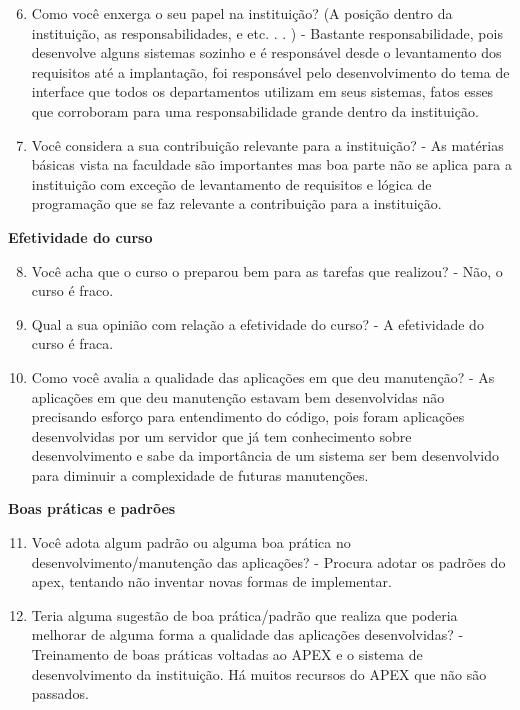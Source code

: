 \begin{apendicesenv}
\begin{enumerate}
	\setcounter{enumi}{5}
	\item Como você enxerga o seu papel na instituição? (A posição dentro da instituição, as
	responsabilidades, e etc. . . )\newline
	-  Bastante responsabilidade, pois desenvolve alguns sistemas sozinho e é responsável desde o levantamento dos requisitos até a implantação, foi responsável pelo desenvolvimento do tema de interface que todos os departamentos utilizam em seus sistemas, fatos esses que corroboram para uma responsabilidade grande dentro da instituição.
	\item Você considera a sua contribuição relevante para a instituição?\newline
	- As matérias básicas vista na faculdade são importantes mas boa parte não se aplica para a instituição com exceção de levantamento de requisitos e lógica de programação que se faz relevante a contribuição para a instituição.
\end{enumerate}

\textbf{Efetividade do curso}

\begin{enumerate}
	\setcounter{enumi}{7}
	\item Você acha que o curso o preparou bem para as tarefas que realizou?\newline
	- Não, o curso é fraco.
	\item Qual a sua opinião com relação a efetividade do curso?\newline
	- A efetividade do curso é fraca.
	\item Como você avalia a qualidade das aplicações em que deu manutenção?\newline
	- As aplicações em que deu manutenção estavam bem desenvolvidas não precisando esforço para entendimento do código, pois foram aplicações desenvolvidas por um servidor que já tem conhecimento sobre desenvolvimento e sabe da importância de um sistema ser bem desenvolvido para diminuir a complexidade de futuras manutenções.
\end{enumerate}

\textbf{Boas práticas e padrões}

\begin{enumerate}
	\setcounter{enumi}{10}
	\item Você adota algum padrão ou alguma boa prática no desenvolvimento/manutenção das
	aplicações?\newline
	- Procura adotar os padrões do apex, tentando não inventar novas formas de implementar.
	\item Teria alguma sugestão de boa prática/padrão que realiza que poderia melhorar de
	alguma forma a qualidade das aplicações desenvolvidas?\newline
	- Treinamento de boas práticas voltadas ao APEX e o sistema de desenvolvimento da instituição. Há muitos recursos do APEX que não são passados.
\end{enumerate}


\end{apendicesenv}
